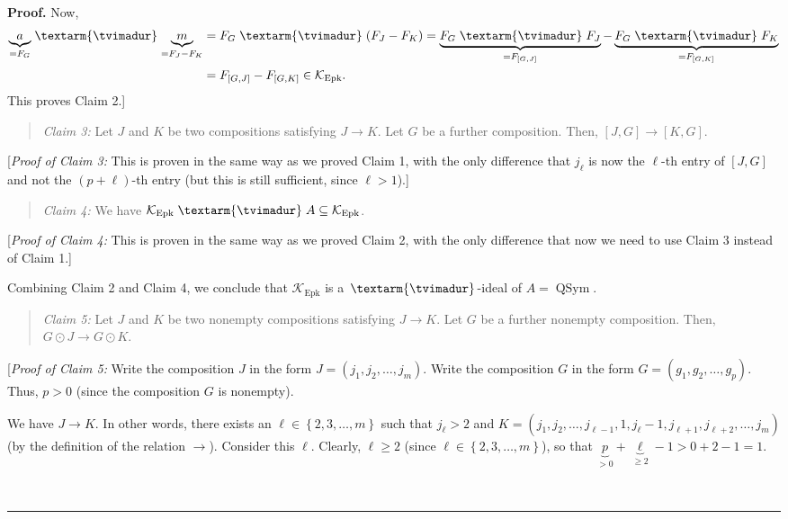 \documentclass[numbers=enddot,12pt,final,onecolumn,notitlepage]{scrartcl}%
\theoremstyle{definition}
\newenvironment{statement}{\begin{quote}}{\end{quote}}
\newenvironment{proof}[1][Proof]{\noindent\textbf{#1.} }{\ \rule{0.5em}{0.5em}}
\newcommand{\tvi}{\left. \textarm{\tvimadur} \right.}
\begin{document}
\begin{proof}
Now,%
\begin{align*}
\underbrace{a}_{=F_{G}}\tvi \underbrace{m}_{=F_{J}-F_{K}}  &  =F_{G}%
\tvi \left(  F_{J}-F_{K}\right)  =\underbrace{F_{G}\tvi F_{J}}_{=F_{\left[
G,J\right]  }}-\underbrace{F_{G}\tvi F_{K}}_{=F_{\left[  G,K\right]  }}\\
&  =F_{\left[  G,J\right]  }-F_{\left[  G,K\right]  }\in\mathcal{K}%
_{\operatorname*{Epk}}.
\end{align*}
This proves Claim 2.]

\begin{statement}
\textit{Claim 3:} Let $J$ and $K$ be two compositions satisfying $J\rightarrow
K$. Let $G$ be a further composition. Then, $\left[  J,G\right]
\rightarrow\left[  K,G\right]  $.
\end{statement}

[\textit{Proof of Claim 3:} This is proven in the same way as we proved Claim
1, with the only difference that $j_{\ell}$ is now the $\ell$-th entry of
$\left[  J,G\right]  $ and not the $\left(  p+\ell\right)  $-th entry (but
this is still sufficient, since $\ell>1$).]

\begin{statement}
\textit{Claim 4:} We have $\mathcal{K}_{\operatorname*{Epk}}\tvi  A\subseteq
\mathcal{K}_{\operatorname*{Epk}}$.
\end{statement}

[\textit{Proof of Claim 4:} This is proven in the same way as we proved Claim
2, with the only difference that now we need to use Claim 3 instead of Claim 1.]

Combining Claim 2 and Claim 4, we conclude that $\mathcal{K}%
_{\operatorname*{Epk}}$ is a $\tvi  $-ideal of $A=\operatorname*{QSym}$.

\begin{statement}
\textit{Claim 5:} Let $J$ and $K$ be two nonempty compositions satisfying
$J\rightarrow K$. Let $G$ be a further nonempty composition. Then, $G\odot
J\rightarrow G\odot K$.
\end{statement}

[\textit{Proof of Claim 5:} Write the composition $J$ in the form $J=\left(
j_{1},j_{2},\ldots,j_{m}\right)  $. Write the composition $G$ in the form
$G=\left(  g_{1},g_{2},\ldots,g_{p}\right)  $. Thus, $p>0$ (since the
composition $G$ is nonempty).

We have $J\rightarrow K$. In other words, there exists an $\ell\in\left\{
2,3,\ldots,m\right\}  $ such that $j_{\ell}>2$ and $K=\left(  j_{1}%
,j_{2},\ldots,j_{\ell-1},1,j_{\ell}-1,j_{\ell+1},j_{\ell+2},\ldots
,j_{m}\right)  $ (by the definition of the relation $\rightarrow$). Consider
this $\ell$. Clearly, $\ell\geq2$ (since $\ell\in\left\{  2,3,\ldots
,m\right\}  $), so that $\underbrace{p}_{>0}+\underbrace{\ell}_{\geq
2}-1>0+2-1=1$.


\end{proof}
\end{document}
